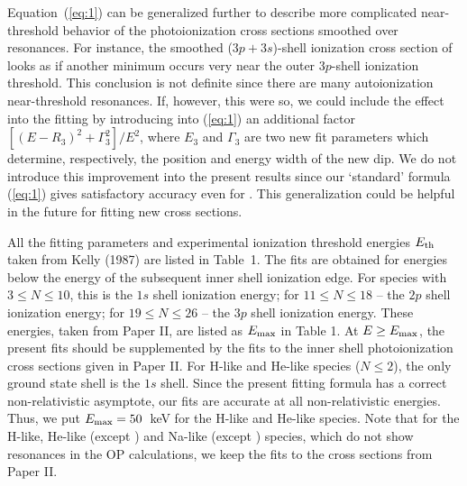 Equation~(\ref{eq:1}) can be generalized further to describe more complicated 
near-threshold behavior of the photoionization cross sections smoothed over 
resonances. For instance, the smoothed ($3p+3s$)-shell ionization cross section
of  looks as if another minimum occurs very near
the outer 3$p$-shell ionization threshold. This conclusion is 
not definite since there are many autoionization near-threshold resonances.
If, however, this were so, we could include the effect into the fitting by
introducing into (\ref{eq:1}) an additional factor
$[(E-R_3)^2+\Gamma_3^2]/E^2$, where $E_3$ and $\Gamma_3$ are two new fit 
parameters which determine, respectively, the position and energy width of the 
new dip. We do not introduce this improvement into the present results since
our `standard' formula (\ref{eq:1}) gives satisfactory accuracy even for 
. This generalization could be helpful in the future for fitting new 
cross sections.

All the fitting parameters and experimental ionization threshold energies
$E_{\rm th}$ taken from  
Kelly (1987) are listed in Table~1. 
The fits are obtained
for energies below the energy of the subsequent inner shell ionization edge. 
For species with $3 \le N \le 10$, this is the $1s$ shell ionization energy; 
for $11 \le N \le 18$ -- the $2p$ shell ionization energy; for  
$19 \le N \le 26$ -- the $3p$ shell ionization energy. These energies, taken 
from Paper II, are listed as $E_{\rm max}$ in Table 1. At $E \ge E_{\rm max}$,
the present fits should be supplemented by the fits to the inner shell 
photoionization cross sections given in Paper II. For H-like and He-like 
species ($N \le 2$), the only ground state shell is the $1s$ shell. Since the 
present fitting formula has a correct non-relativistic asymptote, our fits are 
accurate at all non-relativistic energies. Thus, we put $E_{\rm max} = 50$~keV 
for the H-like and He-like species. Note that for the H-like, He-like (except 
) and Na-like (except ) species, which do not show 
resonances in the OP calculations, we keep the fits to the cross sections from 
Paper II. 


